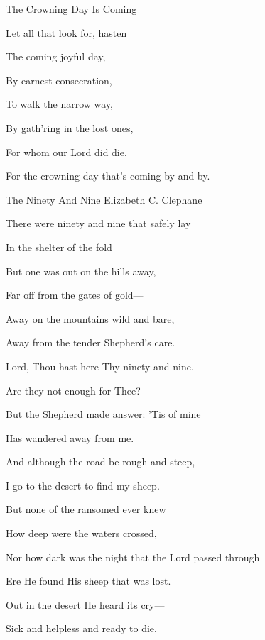 \documentclass[12pt]{book}
\begin{document}
\begin{song}{The Crowning Day Is Coming}{}
  \begin{SBVerse}
    Let all that look for, hasten

    The coming joyful day,

    By earnest consecration,

    To walk the narrow way,

    By gath'ring in the lost ones,

    For whom our Lord did die,

    For the crowning day that's coming by and by.
  \end{SBVerse}
\end{song}


\begin{song}{The Ninety And Nine}{}
  {\SBPubDom}
  {Elizabeth C. Clephane}
  {}
  {}

  \begin{SBVerse}
    There were ninety and nine that safely lay

    In the shelter of the fold

    But one was out on the hills away,

    Far off from the gates of gold---

    Away on the mountains wild and bare,

    Away from the tender Shepherd's care.
  \end{SBVerse}

  \begin{SBVerse}
    Lord, Thou hast here Thy ninety and nine.

    Are they not enough for Thee?

    But the Shepherd made answer: 'Tis of mine

    Has wandered away from me.

    And although the road be rough and steep,

    I go to the desert to find my sheep.
  \end{SBVerse}

  \begin{SBVerse}
    But none of the ransomed ever knew

    How deep were the waters crossed,

    Nor how dark was the night that the Lord passed through

    Ere He found His sheep that was lost.

    Out in the desert He heard its cry---

    Sick and helpless and ready to die.
  \end{SBVerse}


\end{song}
\end{document}
